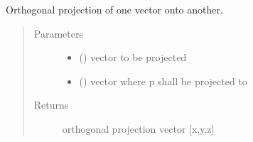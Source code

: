 \documentclass[letterpaper,10pt,english]{sphinxmanual}
\begin{document}
\begin{fulllineitems}
\label{\detokenize{pk_src.misc:pk_src.misc.project}}
Orthogonal projection of one vector onto another.
\begin{quote}\begin{description}
\item[{Parameters}] \leavevmode\begin{itemize}
\item {} 
 (\sphinxstyleliteralemphasis{{[}}\sphinxstyleliteralemphasis{,}\sphinxstyleliteralemphasis{,}\sphinxstyleliteralemphasis{{]}}) \textendash{} vector to be projected

\item {} 
 (\sphinxstyleliteralemphasis{{[}}\sphinxstyleliteralemphasis{,}\sphinxstyleliteralemphasis{,}\sphinxstyleliteralemphasis{{]}}) \textendash{} vector where p shall be projected to

\end{itemize}

\item[{Returns}] \leavevmode
orthogonal projection vector {[}x,y,z{]}

\end{description}\end{quote}

\end{fulllineitems}

\end{document}
